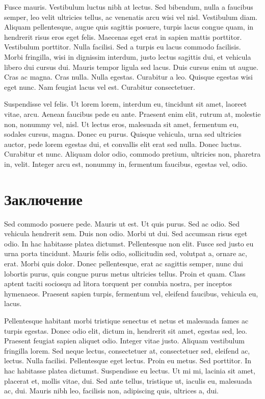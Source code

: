 \documentclass{itmo-report}
\begin{document}
Fusce mauris. Vestibulum luctus nibh at lectus. Sed bibendum, nulla a faucibus semper, leo velit ultricies tellus, ac venenatis arcu wisi vel nisl. Vestibulum diam. Aliquam pellentesque, augue quis sagittis posuere, turpis lacus congue quam, in hendrerit risus eros eget felis. Maecenas eget erat in sapien mattis porttitor. Vestibulum porttitor. Nulla facilisi. Sed a turpis eu lacus commodo facilisis. Morbi fringilla, wisi in dignissim interdum, justo lectus sagittis dui, et vehicula libero dui cursus dui. Mauris tempor ligula sed lacus. Duis cursus enim ut augue. Cras ac magna. Cras nulla. Nulla egestas. Curabitur a leo. Quisque egestas wisi eget nunc. Nam feugiat lacus vel est. Curabitur consectetuer.

Suspendisse vel felis. Ut lorem lorem, interdum eu, tincidunt sit amet, laoreet vitae, arcu. Aenean faucibus pede eu ante. Praesent enim elit, rutrum at, molestie non, nonummy vel, nisl. Ut lectus eros, malesuada sit amet, fermentum eu, sodales cursus, magna. Donec eu purus. Quisque vehicula, urna sed ultricies auctor, pede lorem egestas dui, et convallis elit erat sed nulla. Donec luctus. Curabitur et nunc. Aliquam dolor odio, commodo pretium, ultricies non, pharetra in, velit. Integer arcu est, nonummy in, fermentum faucibus, egestas vel, odio.
\newpage


\section{Заключение}
Sed commodo posuere pede. Mauris ut est. Ut quis purus. Sed ac odio. Sed vehicula hendrerit sem. Duis non odio. Morbi ut dui. Sed accumsan risus eget odio. In hac habitasse platea dictumst. Pellentesque non elit. Fusce sed justo eu urna porta tincidunt. Mauris felis odio, sollicitudin sed, volutpat a, ornare ac, erat. Morbi quis dolor. Donec pellentesque, erat ac sagittis semper, nunc dui lobortis purus, quis congue purus metus ultricies tellus. Proin et quam. Class aptent taciti sociosqu ad litora torquent per conubia nostra, per inceptos hymenaeos. Praesent sapien turpis, fermentum vel, eleifend faucibus, vehicula eu, lacus.

Pellentesque habitant morbi tristique senectus et netus et malesuada fames ac turpis egestas. Donec odio elit, dictum in, hendrerit sit amet, egestas sed, leo. Praesent feugiat sapien aliquet odio. Integer vitae justo. Aliquam vestibulum fringilla lorem. Sed neque lectus, consectetuer at, consectetuer sed, eleifend ac, lectus. Nulla facilisi. Pellentesque eget lectus. Proin eu metus. Sed porttitor. In hac habitasse platea dictumst. Suspendisse eu lectus. Ut mi mi, lacinia sit amet, placerat et, mollis vitae, dui. Sed ante tellus, tristique ut, iaculis eu, malesuada ac, dui. Mauris nibh leo, facilisis non, adipiscing quis, ultrices a, dui.
\newpage
\end{document}
